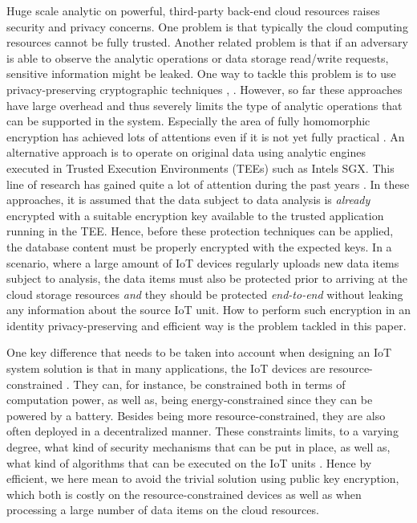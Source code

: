 {Huge scale analytic on powerful, third-party back-end cloud resources raises security and privacy concerns. One problem is that typically the cloud computing resources cannot be fully trusted. Another related problem is that if an adversary is able to observe the analytic operations or data storage read/write requests, sensitive information might be leaked. One way to tackle this problem is to use privacy-preserving cryptographic techniques \cite{Papadimitriou2016} \cite{Popa2011}, \cite{Wang2017}. However, so far these approaches have large overhead and thus severely limits the type of analytic operations that can be supported in the system. Especially the area of fully homomorphic encryption has achieved lots of attentions even if it is not yet fully practical \cite{Acar2018}.  An alternative approach is to operate on original data using analytic engines executed in Trusted Execution Environments (TEEs) such as Intel\textquotesingle s SGX. This line of research has gained quite a lot of attention during the past years \cite{Xu2018}\cite{Zheng2017}\cite{Schuster2015}. In these approaches, it is assumed that the data subject to data analysis is \emph{already} encrypted with a suitable encryption key available to the trusted application running in the TEE. Hence, before these protection techniques can be applied, the database content must be properly encrypted with the expected keys. In a scenario, where a large amount of IoT devices regularly uploads new data items subject to analysis, the data items must also be protected prior to arriving at the cloud storage resources \emph{and} they should be protected \emph{end-to-end}  without leaking any information about the source IoT unit. How to perform such encryption in an identity privacy-preserving and efficient way is the problem tackled in this paper. 

One key difference that needs to be taken into account when designing an IoT system solution is that in many applications, the IoT devices are resource-constrained \cite{Mun2016}.  They can, for instance, be constrained both in terms of computation power, as well as, being energy-constrained since they can be powered by a battery. Besides being more resource-constrained, they are also often deployed in a decentralized manner. These constraints limits, to a varying degree, what kind of security mechanisms that can be put in place, as well as, what kind of algorithms that can be executed on the IoT units \cite{Roman2011}. Hence by efficient, we here mean to avoid the trivial solution using public key encryption, which both is costly on the resource-constrained devices as well as when processing a large number of data items on the cloud resources.

}
